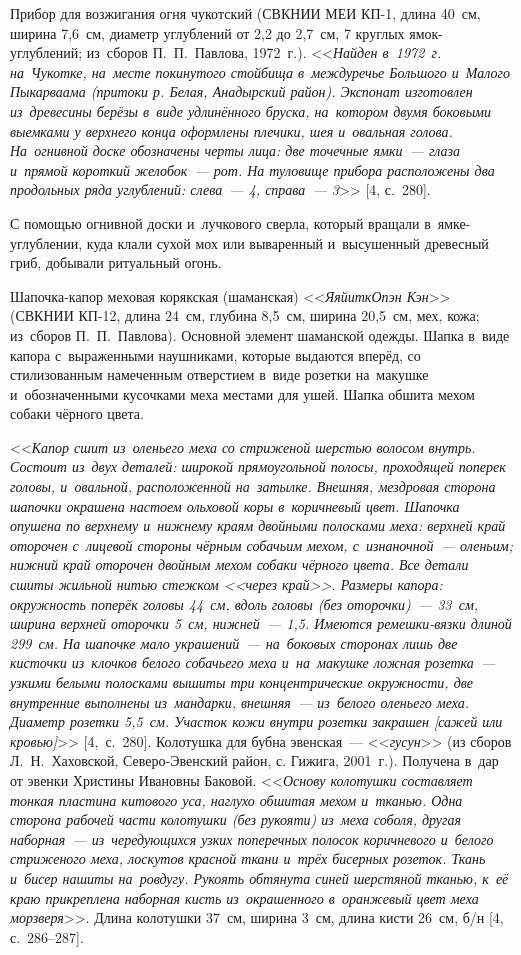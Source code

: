 Прибор для возжигания огня чукотский (СВКНИИ МЕИ КП-1, длина 40~см, ширина 7,6~см, диаметр углублений от 2,2 до 2,7~см, 7 круглых ямок-углублений; из~сборов П.~П.~Павлова, 1972~г.). <<\textit{Найден в~1972~г. на~Чукотке, на~месте покинутого стойбища в~междуречье Большого и~Малого Пыкарваама (притоки р. Белая, Анадырский район). Экспонат изготовлен из~древесины берёзы в~виде удлинённого бруска, на~котором двумя боковыми выемками у верхнего конца оформлены плечики, шея и~овальная голова. На~огнивной доске обозначены черты лица: две точечные ямки~--- глаза и~прямой короткий желобок~--- рот. На туловище прибора расположены два продольных ряда углублений: слева~--- 4, справа~--- 3}>> [4, с.~280].

С помощью огнивной доски и~лучкового сверла, который вращали в~ямке-углублении, куда клали сухой мох или вываренный и~высушенный древесный гриб, добывали ритуальный огонь.

Шапочка-капор меховая корякская (шаманская) <<\textit{ЯяйиткОпэн Кэн}>> (СВКНИИ КП-12, длина 24~см, глубина 8,5~см, ширина 20,5~см, мех, кожа; из~сборов П.~П.~Павлова). Основной элемент шаманской одежды. Шапка в~виде капора с~выраженными наушниками, которые выдаются вперёд, со стилизованным намеченным отверстием в~виде розетки на~макушке и~обозначенными кусочками меха местами для ушей. Шапка обшита мехом собаки чёрного цвета.

<<\textit{Капор сшит из~оленьего меха со стриженой шерстью волосом внутрь. Состоит из~двух деталей: широкой прямоугольной полосы, проходящей поперек головы, и~овальной, расположенной на~затылке. Внешняя, мездровая сторона шапочки окрашена настоем ольховой коры в~коричневый цвет. Шапочка опушена по верхнему и~нижнему краям двойными полосками меха: верхней край оторочен с~лицевой стороны чёрным собачьим мехом, с~изнаночной~--- оленьим; нижний край оторочен двойным мехом собаки чёрного цвета. Все детали сшиты жильной нитью стежком <<\textit{через край}>>. Размеры капора: окружность поперёк головы 44~см, вдоль головы (без оторочки)~--- 33~см, ширина верхней оторочки 5~см, нижней~--- 1,5. Имеются ремешки-вязки длиной 299~см. На шапочке мало украшений~--- на~боковых сторонах лишь две кисточки из~клочков белого собачьего меха и~на~макушке ложная розетка~--- узкими белыми полосками вышиты три концентрические окружности, две внутренние выполнены из~мандарки, внешняя~--- из~белого оленьего меха. Диаметр розетки 5,5~см. Участок кожи внутри розетки закрашен [сажей или кровью]}>> [4,~с.~280].
\clearpage
Колотушка для бубна эвенская~--- <<\textit{гусун}>> (из сборов Л.~Н.~Хаховской, Северо-Эвенский район, с. Гижига, 2001~г.). Получена в~дар от эвенки Христины Ивановны Баковой. <<\textit{Основу колотушки составляет тонкая пластина китового уса, наглухо обшитая мехом и~тканью. Одна сторона рабочей части колотушки (без рукояти) из~меха соболя, другая наборная~--- из~чередующихся узких поперечных полосок коричневого и~белого стриженого меха, лоскутов красной ткани и~трёх бисерных розеток. Ткань и~бисер нашиты на~ровдугу. Рукоять обтянута синей шерстяной тканью, к~её краю прикреплена наборная кисть из~окрашенного в~оранжевый цвет меха морзверя}>>. Длина колотушки 37~см, ширина 3~см, длина кисти 26~см, б/н [4, с.~286--287].

